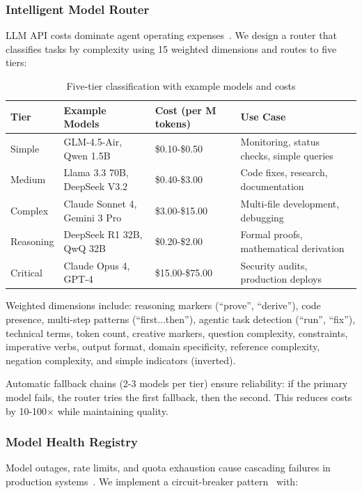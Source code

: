 \documentclass{article}
\begin{document}
\subsubsection{Intelligent Model Router}

LLM API costs dominate agent operating expenses~\cite{liu2023llm}. We design a router that classifies tasks by complexity using 15 weighted dimensions and routes to five tiers:

\begin{table}[h]
\centering
\caption{Five-tier classification with example models and costs}
\small
\begin{tabular}{llll}
\toprule
\textbf{Tier} & \textbf{Example Models} & \textbf{Cost (per M tokens)} & \textbf{Use Case} \\
\midrule
Simple & GLM-4.5-Air, Qwen 1.5B & \$0.10-\$0.50 & Monitoring, status checks, simple queries \\
Medium & Llama 3.3 70B, DeepSeek V3.2 & \$0.40-\$3.00 & Code fixes, research, documentation \\
Complex & Claude Sonnet 4, Gemini 3 Pro & \$3.00-\$15.00 & Multi-file development, debugging \\
Reasoning & DeepSeek R1 32B, QwQ 32B & \$0.20-\$2.00 & Formal proofs, mathematical derivation \\
Critical & Claude Opus 4, GPT-4 & \$15.00-\$75.00 & Security audits, production deploys \\
\bottomrule
\end{tabular}
\end{table}

Weighted dimensions include: reasoning markers (``prove'', ``derive''), code presence, multi-step patterns (``first...then''), agentic task detection (``run'', ``fix''), technical terms, token count, creative markers, question complexity, constraints, imperative verbs, output format, domain specificity, reference complexity, negation complexity, and simple indicators (inverted).

Automatic fallback chains (2-3 models per tier) ensure reliability: if the primary model fails, the router tries the first fallback, then the second. This reduces costs by 10-100$\times$ while maintaining quality.

\subsubsection{Model Health Registry}

Model outages, rate limits, and quota exhaustion cause cascading failures in production systems~\cite{tan2020head}. We implement a circuit-breaker pattern~\cite{ford2000circuit} with:
\end{document}
